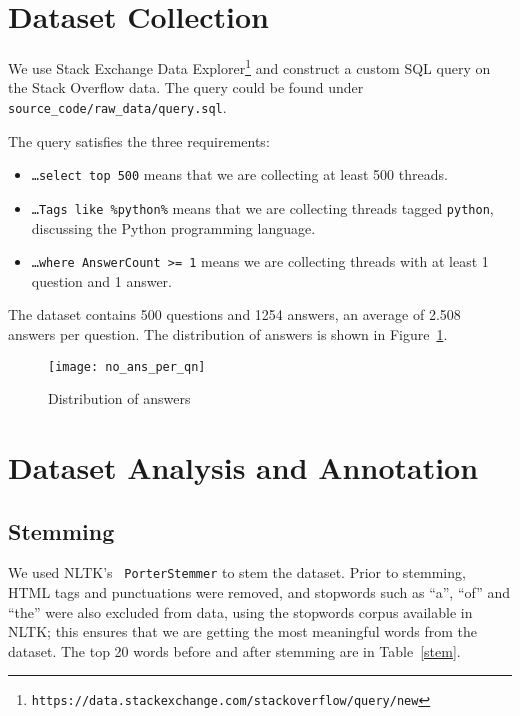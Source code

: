 \section{Dataset Collection}

We use Stack Exchange Data
Explorer\footnote{\texttt{https://data.stackexchange.com/stackoverflow/query/new}}
and construct a custom SQL query on the Stack Overflow data. The query could be
found under \texttt{source\_code/raw\_data/query.sql}.

The query satisfies the three requirements:

\begin{itemize}
    \item \texttt{\ldots select top 500} means that we are collecting at least
    500 threads.
    \item \texttt{\ldots Tags like \textquotesingle{}\%python\%\textquotesingle{}}
    means that we are collecting threads tagged \texttt{python}, discussing the
    Python programming language.
    \item \texttt{\ldots where AnswerCount >= 1} means we are collecting
    threads with at least 1 question and 1 answer.
\end{itemize}

The dataset contains 500 questions and 1254 answers, an average of 2.508 answers
per question. The distribution of answers is shown in Figure~\ref{ans-dist}.

\begin{figure}[h]
\texttt{[image: no\_ans\_per\_qn]}
\caption{Distribution of answers}\label{ans-dist}
\end{figure}

\section{Dataset Analysis and Annotation}

\subsection{Stemming}

We used NLTK's~\cite{nltk} \texttt{PorterStemmer} to stem the dataset.
Prior to stemming, HTML tags and punctuations were removed, and stopwords
such as ``a'', ``of'' and ``the'' were also excluded from data, using the
stopwords corpus available in NLTK\@; this ensures that we are getting the
most meaningful words from the dataset. The top 20 words before and after
stemming are in Table~\ref{stem}.

